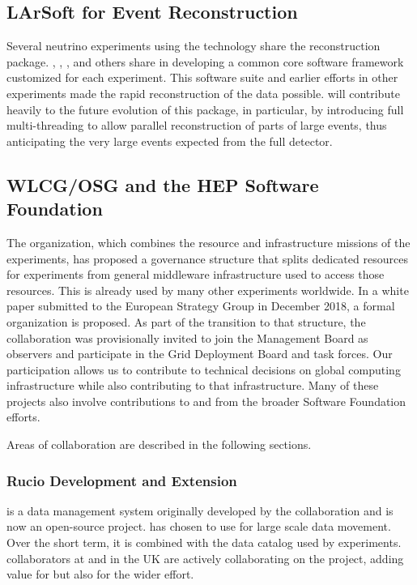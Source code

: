 \subsection{LArSoft for Event Reconstruction}

Several neutrino experiments using the  technology share the \cite{Snider:2017wjd} reconstruction package.  , , , and others share in developing a common core software framework customized for each experiment. This software suite and earlier efforts in other experiments made the rapid reconstruction of the  data possible.   will contribute heavily to  the future evolution of this package, in particular, by introducing full multi-threading to allow parallel reconstruction of parts of large events, thus anticipating the very large events expected from the full detector. 

\subsection{WLCG/OSG and the HEP Software Foundation}
The  \cite{Bird:2014ctt} organization, which combines the resource and infrastructure missions of the  experiments, has proposed a governance structure that splits dedicated resources for  experiments from general middleware infrastructure used to access those resources.  This  is already used by many other experiments worldwide.  In a white paper submitted to the European Strategy Group in December 2018\cite{bib:BirdEUStrategy}, a formal  organization is proposed. As part of the transition to that structure, the  collaboration was provisionally invited to join the  Management Board as observers and participate in the Grid Deployment Board and task forces. Our participation allows us to contribute to technical decisions on global computing infrastructure while also contributing to that infrastructure. 
Many of these projects also involve contributions to and from the broader  Software Foundation efforts. 

Areas of collaboration are described in the following sections. 

\subsubsection{Rucio Development and Extension}

 \cite{Barisits:2019fyl}
is a data management system originally developed by the  collaboration and is now an open-source project.   has chosen to use  for large scale data movement.  Over the short term, it is combined with the  data catalog used by  experiments.   collaborators at  and in the UK are actively collaborating on the  project, adding value for  but also for the wider effort.


